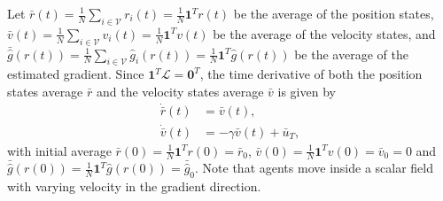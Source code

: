 Let  $\bar{r}(t)=\frac{1}{N} \sum_{i \in \mathcal{V}} r_i(t)= \frac{1}{N} \boldsymbol{1}^T r(t)$ be the average of the position states, $
\bar{v}(t)=\frac{1}{N} \sum_{i \in \mathcal{V}} v_i(t)= \frac{1}{N} \boldsymbol{1}^T v(t)$ be the average of the velocity states, and $
\bar{\hat{g}}(r(t))=\frac{1}{N} \sum_{i \in \mathcal{V}} \hat{g}_i(r(t))= \frac{1}{N} \boldsymbol{1}^T \hat{g}(r(t))$ be the average of the estimated gradient.  Since $\boldsymbol{1}^T \mathcal{L}=\boldsymbol{0}^T$, the time derivative of  both the position states  average $\bar{r}$  and the velocity states  average $\bar{v}$ is given by
\begin{align}
\dot{\bar{r}}(t) & = \bar{v}(t), \nonumber \\
\dot{\bar{v}}(t) & = -\gamma\bar{v}(t) + \bar{u}_T,
\end{align} 
with initial average $\bar{r}(0)=\frac{1}{N}\boldsymbol{1}^Tr(0)=\bar{r}_{0} $, $\bar{v}(0)=\frac{1}{N}\boldsymbol{1}^Tv(0)=\bar{v}_{0} =0 $ and $\bar{\hat{g}}(r(0))= \frac{1}{N}\boldsymbol{1}^T\hat{g}(r(0))=\bar{\hat{g}}_{0}$. 
 Note that agents move inside a scalar field with varying velocity  in the gradient direction. %


